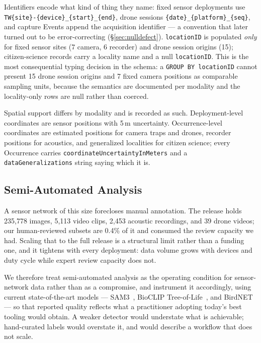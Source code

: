 \documentclass[sigconf]{acmart}
\begin{document}
Identifiers encode what kind of thing they name: fixed sensor
deployments use \texttt{TW\{site\}-\{device\}\_\{start\}\_\{end\}},
drone sessions \texttt{\{date\}\_\{platform\}\_\{seq\}}, and capture
Events append the acquisition identifier --- a convention that later
turned out to be error-correcting (\S\ref{sec:nulldefect}).
\texttt{locationID} is populated \emph{only} for fixed sensor sites
(7 camera, 6 recorder) and drone session origins (15); citizen-science
records carry a locality name and a null \texttt{locationID}. This is the most consequential typing decision in
the schema: a \texttt{GROUP BY locationID} cannot present 15 drone
session origins and 7 fixed camera positions as comparable sampling
units, because the semantics are documented per modality and the
locality-only rows are null rather than coerced.

Spatial support differs by modality and is recorded as such.
Deployment-level coordinates are sensor positions with 5\,m uncertainty.
Occurrence-level coordinates are estimated positions for camera traps
and drones, recorder positions for acoustics, and generalized localities
for citizen science; every Occurrence carries
\texttt{coordinateUncertaintyInMeters} and a
\texttt{dataGeneralizations} string saying which it is.

\subsection{Semi-Automated Analysis}
\label{sec:provenance}

A sensor network of this size forecloses manual annotation. The release
holds 235{,}778 images, 5{,}113 video clips, 2{,}453 acoustic
recordings, and 39 drone videos; our human-reviewed subsets are 0.4\% of
it and consumed the review capacity we had. Scaling that to the full
release is a structural limit rather than a funding one, and it tightens
with every deployment: data volume grows with devices and duty cycle
while expert review capacity does not.

We therefore treat semi-automated analysis as the operating condition
for sensor-network data rather than as a compromise, and instrument it
accordingly, using current state-of-the-art models ---
SAM3~\cite{carion2026sam}, BioCLIP
Tree-of-Life~\cite{stevens2024bioclip,gu2025bioclip,treeoflife_200m},
and BirdNET~\cite{kahl2021birdnet} --- so that reported quality reflects
what a practitioner adopting today's best tooling would obtain. A weaker
detector would understate what is achievable; hand-curated labels would
overstate it, and would describe a workflow that does not scale.
\end{document}
